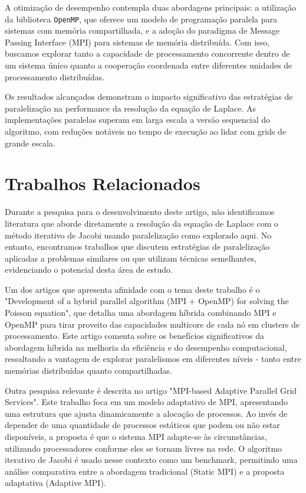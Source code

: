 \documentclass[conference]{IEEEtran}
\begin{document}
A otimização de desempenho contempla duas abordagens principais: a utilização da biblioteca \texttt{OpenMP}, que oferece um modelo de programação paralela para sistemas com memória compartilhada, e a adoção do paradigma de Message Passing Interface (MPI) para sistemas de memória distribuída. Com isso, buscamos explorar tanto a capacidade de processamento concorrente dentro de um sistema único quanto a cooperação coordenada entre diferentes unidades de processamento distribuídas.

Os resultados alcançados demonstram o impacto significativo das estratégias de paralelização na performance da resolução da equação de Laplace. As implementações paralelas superam em larga escala a versão sequencial do algoritmo, com reduções notáveis no tempo de execução ao lidar com grids de grande escala.

\section{Trabalhos Relacionados}

Durante a pesquisa para o desenvolvimento deste artigo, não identificamos literatura que aborde diretamente a resolução da equação de Laplace com o método iterativo de Jacobi usando paralelização como explorado aqui. No entanto, encontramos trabalhos que discutem estratégias de paralelização aplicadas a problemas similares ou que utilizam técnicas semelhantes, evidenciando o potencial desta área de estudo.

Um dos artigos que apresenta afinidade com o tema deste trabalho é o "Development of a hybrid parallel algorithm (MPI + OpenMP) for solving the Poisson equation"\cite{kenzhebek2018hybrid}, que detalha uma abordagem híbrida combinando MPI e OpenMP para tirar proveito das capacidades multicore de cada nó em clusters de processamento. Este artigo comenta sobre os benefícios significativos da abordagem híbrida na melhoria da eficiência e do desempenho computacional, ressaltando a vantagem de explorar paralelismos em diferentes níveis - tanto entre memórias distribuídas quanto compartilhadas.

Outra pesquisa relevante é descrita no artigo "MPI-based Adaptive Parallel Grid Services"\cite{abburi2003mpi}. Este trabalho foca em um modelo adaptativo de MPI, apresentando uma estrutura que ajusta dinamicamente a alocação de processos. Ao invés de depender de uma quantidade de processos estáticos que podem ou não estar disponíveis, a proposta é que o sistema MPI adapte-se às circunstâncias, utilizando processadores conforme eles se tornam livres na rede. O algoritmo iterativo de Jacobi é usado nesse contexto como um benchmark, permitindo uma análise comparativa entre a abordagem tradicional (Static MPI) e a proposta adaptativa (Adaptive MPI).
\end{document}
